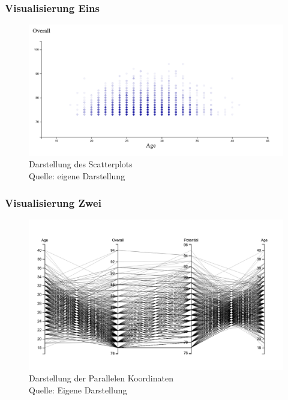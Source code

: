\documentclass[usegeometry=true]{scrartcl}
\begin{document}
\subsubsection{Visualisierung Eins}

\begin{figure}[h]
\centering
\includegraphics[scale=0.4]{grafiken/Scatterplot1}
\caption{Darstellung des Scatterplots\\ Quelle: eigene Darstellung}
\end{figure}


\subsubsection{Visualisierung Zwei}

\begin{figure}[h]
\centering
\includegraphics[scale=0.4]{grafiken/ParalleleKoordinaten1}
\caption{Darstellung der Parallelen Koordinaten\\ Quelle: Eigene Darstellung}
\end{figure}
\end{document}

